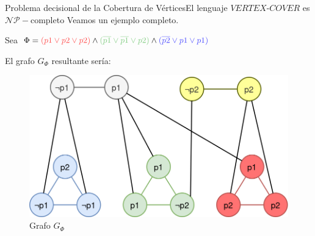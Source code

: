 \documentclass[10pt, envcountsect, presentation, aspectratio=169]{beamer}
\begin{document}

\begin{frame}{Problema decisional de la Cobertura de Vértices}{El lenguaje $VERTEX\text{-}COVER$ es $\mathcal{NP}-$completo}
    \centering
    Veamos un ejemplo completo.

    Sea $\Phi = \textcolor{palered}{(p1 \vee p2 \vee p2)} \wedge \textcolor{palegreen}{(\overline{p1} \vee \overline{p1} \vee p2)} \wedge \textcolor{paleblue}{(\overline{p2} \vee p1 \vee p1)}$

    El grafo $G_\Phi$ resultante sería:
    \begin{figure}
        \centering
        \includegraphics[width=0.65\linewidth]{images/T2_3_grafo.png}
        \caption{Grafo $G_\Phi$}
        \label{fig:enter-label}
    \end{figure}
\end{frame}
\end{document}
